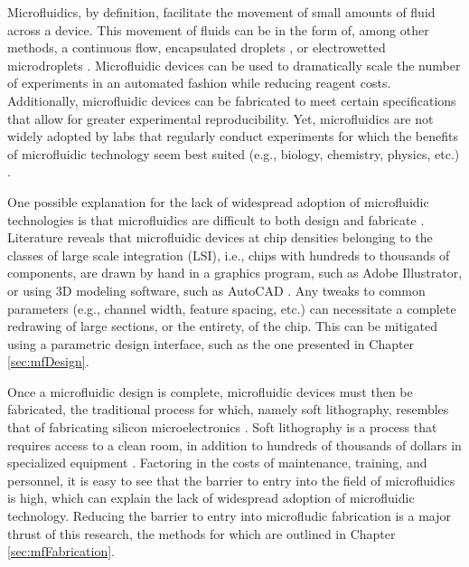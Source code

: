 Microfluidics, by definition, facilitate the movement of small amounts of fluid across a device. This movement of fluids can be in the form of, among other methods, a continuous flow, encapsulated droplets \cite{teh2008droplet}, or electrowetted microdroplets \cite{kim2001micropumping}. Microfluidic devices can be used to dramatically scale the number of experiments in an automated fashion while reducing reagent costs. Additionally, microfluidic devices can be fabricated to meet certain specifications that allow for greater experimental reproducibility. Yet, microfluidics are not widely adopted by labs that regularly conduct experiments for which the benefits of microfluidic technology seem best suited (e.g., biology, chemistry, physics, etc.) \cite{whitesides2006}. 

One possible explanation for the lack of widespread adoption of microfluidic technologies is that microfluidics are difficult to both design and fabricate \cite{whitesides2006}. Literature reveals that microfluidic devices at chip densities belonging to the classes of large scale integration (LSI), i.e., chips with hundreds to thousands of components, are drawn by hand in a graphics program, such as Adobe Illustrator, or using 3D modeling software, such as AutoCAD \cite{araci2014}. Any tweaks to common parameters (e.g., channel width, feature spacing, etc.) can necessitate a complete redrawing of large sections, or the entirety, of the chip. This can be mitigated using a parametric design interface, such as the one presented in Chapter \ref{sec:mfDesign}. 

Once a microfluidic design is complete, microfluidic devices must then be fabricated, the traditional process for which, namely soft lithography, resembles that of fabricating silicon microelectronics \cite{anderson2000fabrication}. Soft lithography is a process that requires access to a clean room, in addition to hundreds of thousands of dollars in specialized equipment \cite{xia1998soft}. Factoring in the costs of maintenance, training, and personnel, it is easy to see that the barrier to entry into the field of microfluidics is high, which can explain the lack of widespread adoption of microfluidic technology. Reducing the barrier to entry into microfludic fabrication is a major thrust of this research, the methods for which are outlined in Chapter \ref{sec:mfFabrication}.

